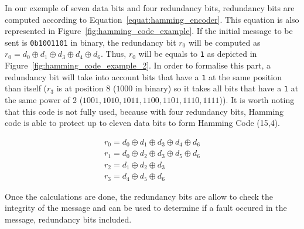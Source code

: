 In our exemple of seven data bits and four redundancy bits, redundancy bits are computed according to Equation~\ref{equat:hamming_encoder}. This equation is also represented in Figure~\ref{fig:hamming_code_example}. If the initial message to be sent is \texttt{0b1001101} in binary, the redundancy bit $r_0$ will be computed as $r_0 = d_{0} \oplus d_{1} \oplus d_{3} \oplus d_{4} \oplus d_{6}$. Thus, $r_0$ will be equals to \texttt{1} as depicted in Figure~\ref{fig:hamming_code_example_2}. In order to formalise this part, a redundancy bit will take into account bits that have a \texttt{1} at the same position than itself ($r_3$ is at position 8 ($1000$ in binary) so it takes all bits that have a \texttt{1} at the same power of 2 ($1001, 1010, 1011, 1100, 1101, 1110, 1111$)). It is worth noting that this code is not fully used, because with four redundancy bits, Hamming code is able to protect up to eleven data bits to form Hamming Code (15,4).

\begin{equation} \label{equat:hamming_encoder}
    \begin{split}
        r_{0} = d_{0} \oplus d_{1} \oplus d_{3} \oplus d_{4} \oplus d_{6} \\
        r_{1} = d_{0} \oplus d_{2} \oplus d_{3} \oplus d_{5} \oplus d_{6} \\
        r_{2} = d_{1} \oplus d_{2} \oplus d_{3} \\
        r_{3} = d_{4} \oplus d_{5} \oplus d_{6}
    \end{split}
\end{equation}

Once the calculations are done, the redundancy bits are allow to check the integrity of the message and can be used to determine if a fault occured in the message, redundancy bits included.


